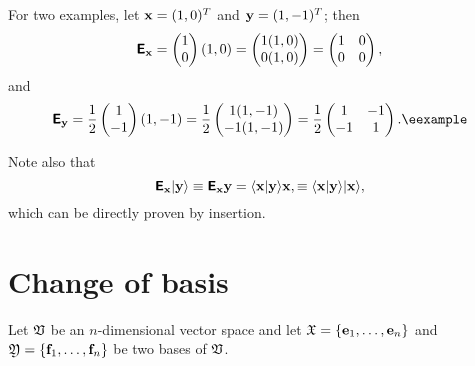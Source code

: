 {
\color{blue}
\bexample
For two examples, let
${\bf x}=(1,0)^T$
and
${\bf y}=(1,-1)^T$;
then
$$
\textsf{\textbf{E}}_{\bf x}
=
\begin{pmatrix}
1\\
0
\end{pmatrix}
(1,0)
=
\begin{pmatrix}
1(1,0)\\
0(1,0)
\end{pmatrix}
=
\begin{pmatrix}
1&0\\
0&0
\end{pmatrix}
,
$$
and
$$
\textsf{\textbf{E}}_{\bf y}
= \frac{1}{2}
\begin{pmatrix}
1\\
-1
\end{pmatrix}
(1,-1)
= \frac{1}{2}
\begin{pmatrix}
1(1,-1)\\
-1(1,-1)
\end{pmatrix}
= \frac{1}{2}
\begin{pmatrix}
1&-1\\
-1&1
\end{pmatrix}
.
\textrm{\eexample}
$$
}

Note also that
\begin{equation}
\textsf{\textbf{E}}_{\bf x} \vert {\bf y}\rangle
\equiv
\textsf{\textbf{E}}_{\bf x} {\bf y}
=
\langle {\bf x}\vert  {\bf y} \rangle {\bf x},
\equiv
\langle {\bf x}\vert  {\bf y} \rangle \vert {\bf x}\rangle ,
\end{equation}
which can be directly proven by insertion.







\section{Change of basis}
\label{2012-m-ch-fdlvs-changeofbasis}

Let ${\frak V}$ be an $n$-dimensional vector space and let
${\frak X}
=
\{
{\bf e}_1,
\ldots ,
{\bf e}_n
\}$
and
${\frak Y}
=  \{
{\bf f}_1,
\ldots ,
{\bf f}_n
\}$ be two bases of ${\frak V}$.

